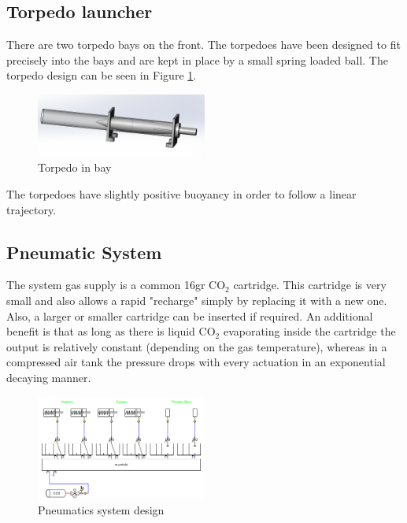 \subsection{Torpedo launcher}
There are two torpedo  bays on the front. The torpedoes have been designed to fit precisely into the bays and are kept in place by a small spring loaded ball. The torpedo design can be seen in Figure \ref{fig:torpedo}.

\begin{figure}[!b]
    \includegraphics[width=0.5\textwidth]{./figure/torpedo_loaded.png}
    \caption{Torpedo in bay}
    \label{fig:torpedo}
\end{figure}

The torpedoes have slightly positive buoyancy in order to follow a linear trajectory. 

\subsection{Pneumatic System}
The system gas supply is a common 16gr CO$_2$ cartridge. This cartridge is very small and also allows a rapid "recharge" simply by replacing it with a new one. Also, a larger or smaller cartridge can be inserted if required. An additional benefit is that as long as there is liquid CO$_2$ evaporating inside the cartridge the output is relatively constant (depending on the gas temperature), whereas in a compressed air tank the pressure drops with every actuation in an exponential decaying manner.

\begin{figure}[!t]
    \includegraphics[width=0.5\textwidth]{./figure/pneumatics.png}
    \caption{Pneumatics system design}
    \label{fig:pneumatics}
\end{figure}

